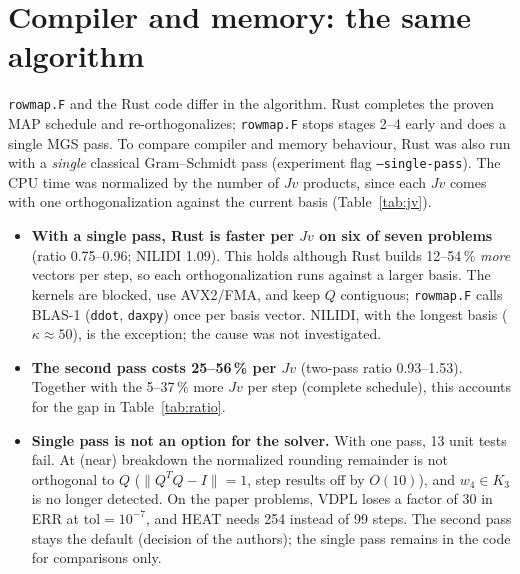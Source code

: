 \documentclass[11pt,a4paper]{article}
\begin{document}
\section{Compiler and memory: the same algorithm}

\texttt{rowmap.F} and the Rust code differ in the algorithm. Rust completes
the proven MAP schedule and re-orthogonalizes; \texttt{rowmap.F} stops
stages 2--4 early and does a single MGS pass. To compare compiler and memory
behaviour, Rust was also run with a \emph{single} classical Gram--Schmidt pass
(experiment flag \texttt{--single-pass}). The CPU time was normalized by the
number of $Jv$ products, since each $Jv$ comes with one orthogonalization
against the current basis (Table~\ref{tab:jv}).

\begin{table}[htbp]\centering\small
  
  \caption{Cost per $Jv$ product (user $Jv$ + Gram--Schmidt + bookkeeping),
    geometric means over $\mathrm{tol}=10^{-2},\dots,10^{-7}$. Ratio:
    Rust/Fortran per $Jv$.}
  \label{tab:jv}
\end{table}

\begin{itemize}
  \item \textbf{With a single pass, Rust is faster per $Jv$ on six of seven
    problems} (ratio 0.75--0.96; NILIDI 1.09). This holds although Rust builds
    12--54\,\% \emph{more} vectors per step, so each orthogonalization runs
    against a larger basis. The kernels are blocked, use AVX2/FMA, and keep
    $Q$ contiguous; \texttt{rowmap.F} calls BLAS-1 (\texttt{ddot},
    \texttt{daxpy}) once per basis vector. NILIDI, with the longest basis
    ($\kappa\approx50$), is the exception; the cause was not investigated.
  \item \textbf{The second pass costs 25--56\,\% per $Jv$} (two-pass ratio
    0.93--1.53). Together with the 5--37\,\% more $Jv$ per step (complete
    schedule), this accounts for the gap in Table~\ref{tab:ratio}.
  \item \textbf{Single pass is not an option for the solver.} With one pass,
    13 unit tests fail. At (near) breakdown the normalized rounding remainder
    is not orthogonal to $Q$ ($\|Q^TQ-I\|=1$, step results off by $O(10)$),
    and $w_4\in K_3$ is no longer detected. On the paper problems, VDPL
    loses a factor of 30 in ERR at $\mathrm{tol}=10^{-7}$, and HEAT needs 254
    instead of 99 steps. The second pass stays the default (decision of the
    authors); the single pass remains in the code for comparisons only.
\end{itemize}
\end{document}
